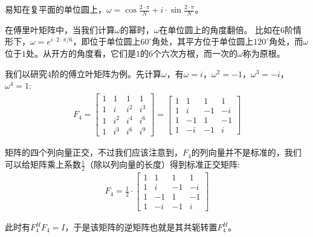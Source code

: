 易知在复平面的单位圆上，$\omega=\cos\frac{2\cdot \pi}{N}+i\cdot \sin\frac{2\cdot \pi}{N}$。

在傅里叶矩阵中，当我们计算$\omega$的幂时，$\omega$在单位圆上的角度翻倍。
比如在$6$阶情形下，$\omega=e^{i\cdot 2\cdot \pi/6}$，即位于单位圆上$60^\circ$角处，其平方位于单位圆上$120^\circ$角处，而$\omega$位于$1$处。从开方的角度看，它们是$1$的$6$个六次方根，而一次的$\omega$称为原根。

我们以研究$4$阶的傅立叶矩阵为例。先计算$\omega$，有$\omega=i$，$\omega^2=-1$，$\omega^3=-i$，$\omega^4=1$:
\begin{align*}
	F_4=\begin{bmatrix}1&1&1&1\\1&i&i^2&i^3\\1&i^2&i^4&i^6\\1&i^3&i^6&i^9\end{bmatrix}=\begin{bmatrix}1&1&1&1\\1&i&-1&-i\\1&-1&1&-1\\1&-i&-1&i\end{bmatrix}
\end{align*}

矩阵的四个列向量正交，不过我们应该注意到，$F_4$的列向量并不是标准的，我们可以给矩阵乘上系数$\frac{1}{2}$（除以列向量的长度）得到标准正交矩阵:
\begin{align*}
	F_4=\frac{1}{2}\cdot \begin{bmatrix}1&1&1&1\\1&i&-1&-i\\1&-1&1&-1\\1&-i&-1&i\end{bmatrix}
\end{align*}

此时有$F_4^HF_4=I$，于是该矩阵的逆矩阵也就是其共轭转置$F_4^H$。

